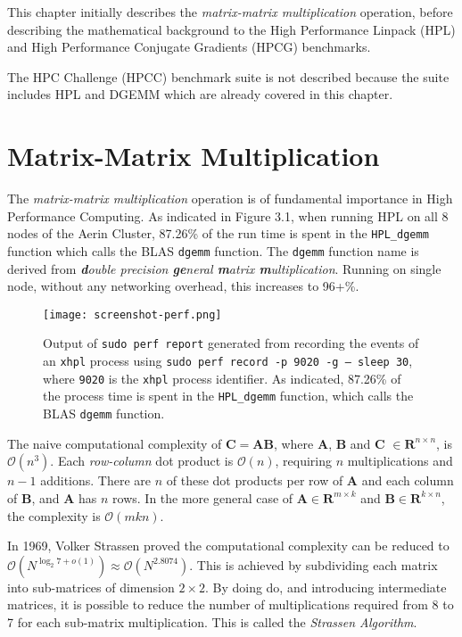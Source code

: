 This chapter initially describes the \emph{matrix-matrix multiplication} operation, before describing the mathematical background to the High Performance Linpack (HPL) and High Performance Conjugate Gradients (HPCG) benchmarks.

The HPC Challenge (HPCC) benchmark suite is not described because the suite includes HPL and DGEMM which are already covered in this chapter.


%
%
\section{Matrix-Matrix Multiplication}

The \emph{matrix-matrix multiplication} operation is of fundamental importance in High Performance Computing. As indicated in Figure 3.1, when running HPL on all 8 nodes of the Aerin Cluster, 87.26\% of the run time is spent in the \verb|HPL_dgemm| function which calls the BLAS \verb|dgemm| function. The \verb|dgemm| function name is derived from \emph{\textbf{d}ouble precision \textbf{ge}neral \textbf{m}atrix \textbf{m}ultiplication}. Running on single node, without any networking overhead, this increases to 96+\%.

\begin{figure}[h]
	\centering	
	\texttt{[image: screenshot-perf.png]}
	\caption{Output of \texttt{sudo perf report} generated from recording the events of an \texttt{xhpl} process using \texttt{sudo perf record -p 9020 -g -- sleep 30}, where \texttt{9020} is the \texttt{xhpl} process identifier. As indicated, 87.26\% of the process time is spent in the \texttt{HPL\_dgemm} function, which calls the BLAS \texttt{dgemm} function.}
\end{figure}

The naive computational complexity of $\mathbf{C} = \mathbf{AB}$, where $\mathbf{A}$, $\mathbf{B}$ and $\mathbf{C}$ $\in \mathbf{R}^{n \times n}$, is $\mathcal{O}(n^3)$. Each \emph{row-column} dot product is $\mathcal{O}(n)$, requiring $n$ multiplications and $n - 1$ additions. There are $n$ of these dot products per row of $\mathbf{A}$ and each column of $\mathbf{B}$, and $\mathbf{A}$ has $n$ rows. In the more general case of $\mathbf{A} \in \mathbf{R}^{m \times k}$ and $\mathbf{B} \in \mathbf{R}^{k \times n}$, the complexity is $\mathcal{O}(mkn).$ 

In 1969, Volker Strassen proved the computational complexity can be reduced to $\mathcal{O}(N^{\log _{2}7+o(1)})\approx \mathcal{O}(N^{2.8074})$. This is achieved by subdividing each matrix into sub-matrices of dimension $2 \times 2$. By doing do, and introducing intermediate matrices, it is possible to reduce the number of multiplications required from 8 to 7 for each sub-matrix multiplication. This is called the \emph{Strassen Algorithm}.

